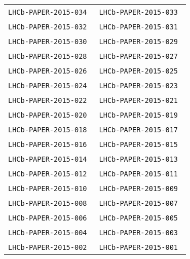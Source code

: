\begin{center}
\begin{longtable}{ll}
\texttt{LHCb-PAPER-2015-034}~\cite{LHCb-PAPER-2015-034} &
\texttt{LHCb-PAPER-2015-033}~\cite{LHCb-PAPER-2015-033} \\
\texttt{LHCb-PAPER-2015-032}~\cite{LHCb-PAPER-2015-032} &
\texttt{LHCb-PAPER-2015-031}~\cite{LHCb-PAPER-2015-031} \\
\texttt{LHCb-PAPER-2015-030}~\cite{LHCb-PAPER-2015-030} &
\texttt{LHCb-PAPER-2015-029}~\cite{LHCb-PAPER-2015-029} \\
\texttt{LHCb-PAPER-2015-028}~\cite{LHCb-PAPER-2015-028} &
\texttt{LHCb-PAPER-2015-027}~\cite{LHCb-PAPER-2015-027} \\
\texttt{LHCb-PAPER-2015-026}~\cite{LHCb-PAPER-2015-026} &
\texttt{LHCb-PAPER-2015-025}~\cite{LHCb-PAPER-2015-025} \\
\texttt{LHCb-PAPER-2015-024}~\cite{LHCb-PAPER-2015-024} &
\texttt{LHCb-PAPER-2015-023}~\cite{LHCb-PAPER-2015-023} \\
\texttt{LHCb-PAPER-2015-022}~\cite{LHCb-PAPER-2015-022} &
\texttt{LHCb-PAPER-2015-021}~\cite{LHCb-PAPER-2015-021} \\
\texttt{LHCb-PAPER-2015-020}~\cite{LHCb-PAPER-2015-020} &
\texttt{LHCb-PAPER-2015-019}~\cite{LHCb-PAPER-2015-019} \\
\texttt{LHCb-PAPER-2015-018}~\cite{LHCb-PAPER-2015-018} &
\texttt{LHCb-PAPER-2015-017}~\cite{LHCb-PAPER-2015-017} \\
\texttt{LHCb-PAPER-2015-016}~\cite{LHCb-PAPER-2015-016} &
\texttt{LHCb-PAPER-2015-015}~\cite{LHCb-PAPER-2015-015} \\
\texttt{LHCb-PAPER-2015-014}~\cite{LHCb-PAPER-2015-014} &
\texttt{LHCb-PAPER-2015-013}~\cite{LHCb-PAPER-2015-013} \\
\texttt{LHCb-PAPER-2015-012}~\cite{LHCb-PAPER-2015-012} &
\texttt{LHCb-PAPER-2015-011}~\cite{LHCb-PAPER-2015-011} \\
\texttt{LHCb-PAPER-2015-010}~\cite{LHCb-PAPER-2015-010} &
\texttt{LHCb-PAPER-2015-009}~\cite{LHCb-PAPER-2015-009} \\
\texttt{LHCb-PAPER-2015-008}~\cite{LHCb-PAPER-2015-008} &
\texttt{LHCb-PAPER-2015-007}~\cite{LHCb-PAPER-2015-007} \\
\texttt{LHCb-PAPER-2015-006}~\cite{LHCb-PAPER-2015-006} &
\texttt{LHCb-PAPER-2015-005}~\cite{LHCb-PAPER-2015-005} \\
\texttt{LHCb-PAPER-2015-004}~\cite{LHCb-PAPER-2015-004} &
\texttt{LHCb-PAPER-2015-003}~\cite{LHCb-PAPER-2015-003} \\
\texttt{LHCb-PAPER-2015-002}~\cite{LHCb-PAPER-2015-002} &
\texttt{LHCb-PAPER-2015-001}~\cite{LHCb-PAPER-2015-001} \\

\end{longtable}
\end{center}

